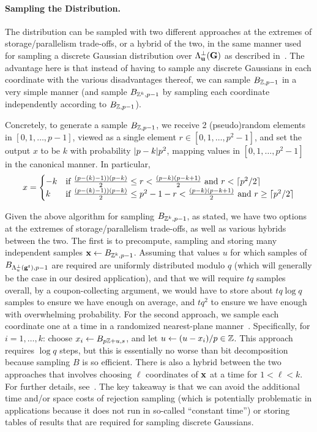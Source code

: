 \paragraph{Sampling the Distribution.} The distribution can be sampled
with two different approaches at the extremes of storage/parallelism trade-offs, or a hybrid of the two, in the same
manner used for sampling a discrete Gaussian distribution over
$\Lambda^{\perp}_{\mathbf{u}}(\mathbf{G})$ as described
in~\cite{DBLP:conf/eurocrypt/MicciancioP12}. The advantage here is
that instead of having to sample any discrete Gaussians in each
coordinate with the various disadvantages thereof, we can sample
$B_{\mathbb{Z},p-1}$ in a very simple manner (and sample $B_{\mathbb{Z}^k,p-1}$ by
sampling each coordinate independently according to $B_{\mathbb{Z},p-1}$).

Concretely, to generate a sample $B_{\mathbb{Z},p-1}$, we receive 2
(pseudo)random elements in $[0,1,\ldots,p-1]$, viewed as a single
element $r \in [0,1,\ldots,p^2-1]$, and set the output $x$ to be $k$ with
probability $\lvert p-k\rvert{p^2}$, mapping values in $[0,1,\ldots,p^2-1]$ in
the canonical manner. In particular,
\[x= \begin{cases}-k& \text{if }
  \tfrac{(p-(k)-1))(p-k)}{2} \leq r <
  \tfrac{(p-k)(p-k+1)}{2} \text{ and } r < \lceil p^2/2\rceil\\
k&\text{if }
  \tfrac{(p-(k)-1))(p-k)}{2} \leq p^2-1-r < \tfrac{(p-k)(p-k+1)}{2} \text{ and } r \geq \lceil p^2/2\rceil
\end{cases}
\]

Given the above algorithm for sampling $B_{\mathbb{Z}^k,p-1}$, as stated, we
have two options at the extremes of storage/parallelism trade-offs, as
well as various hybrids between the two.  The first is to precompute,
sampling and storing many independent samples
$\mathbf{x} \gets B_{\mathbb{Z}^k,p-1}$. Assuming that values $u$ for which samples
of $B_{\Lambda^{\perp}_{u}(\mathbf{g}^t),p-1}$ are required are uniformly
distributed modulo $q$ (which will generally be the case in our
desired application), and that we will require $tq$ samples overall,
by a coupon-collecting argument, we would have to store about
$tq\log{q}$ samples to ensure we have enough on average, and $tq^2$ to
ensure we have enough with overwhelming probability. 
For the second approach, we sample each coordinate one at a time in a
randomized nearest-plane
manner~\cite{DBLP:conf/stoc/GentryPV08,DBLP:conf/eurocrypt/MicciancioP12}. Specifically, 
for $i=1, \ldots, k$: choose $x_i \gets B_{p\mathbb{Z}+u,s}$, and let $u
  \gets (u-x_i)/p \in \mathbb{Z}$. This approach requires $\log{q}$ steps, but
  this is essentially no worse than bit decomposition because sampling
  $B$ is so efficient. There is also a hybrid between the two
  approaches that involves choosing  $\ell$ coordinates of $\mathbf{x}$ at
  a time for $1 < \ell < k$. For further details,
  see~\cite{DBLP:conf/eurocrypt/MicciancioP12}. The key takeaway is
  that we can avoid the additional time and/or space costs of
  rejection sampling (which is potentially problematic in applications
  because it does not run in so-called ``constant time'')
  or storing tables of results that are required for sampling discrete Gaussians.



